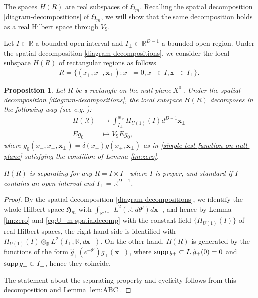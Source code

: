 \documentclass[12pt]{article}
\def\RR{{\mathbb R}}
\def\hm{\mathfrak{H}_m}
\def\supp{{\rm supp\,}}
\newtheorem{proposition}[theorem]{Proposition}
\theoremstyle{remark}
\begin{document}
The spaces $H(R)$ are real subspaces of $\hm$.
Recalling the spatial decomposition \eqref{diagram-decompositions} of $\hm$, we will show that the same decomposition holds as a real Hilbert space through $V_{\mathrm S}$.

Let $I \subset \RR$ a bounded open interval and $I_\perp \subset \RR^{D-1}$ a bounded open region.
Under the spatial decomposition \eqref{diagram-decompositions}, we consider the local subspace $H(R)$ of rectangular regions as follows
\[
 R = \{(x_+,x_-,\pmb{x}_\perp): x_-=0, x_+ \in I, \pmb{x}_\perp \in I_\perp\}. 
\]

  \begin{proposition}\label{decomposition-subspace-null-product}
  Let $R$ be a rectangle on the null plane $X_-^0$.
   Under the spatial decomposition \eqref{diagram-decompositions}, the local subspace $H(R)$
   decomposes in the following way (see e.g.\! \cite[Proposition B.2]{MT18}):
     \begin{align}\label{eq:disrect}
      H(R) &\to \int^{\oplus_\RR}_{I_\perp} H_{U(1)}(I) d^{D-1}\pmb{x}_\perp \\
      Eg_0 &\mapsto  V_{\mathrm S}Eg_0,\nonumber
     \end{align}
 where $g_0(x_-,x_+,\pmb{x}_\perp)= \delta(x_-)g(x_+, \pmb{x}_\perp)$ as in \eqref{simple-test-function-on-null-plane}
 satisfying the condition of Lemma \ref{lm:zero}.

  $H(R)$ is separating for any $R = I\times I_\perp$ where $I$ is proper,
  and standard if $I$ contains an open interval and $I_\perp = \RR^{D-1}$.
  \end{proposition}
  \begin{proof}
    By the spatial decomposition \eqref{diagram-decompositions},
    we identify the whole Hilbert space $\hm$ with $\int_{\RR^{D-1}} L^2(\RR,d\theta')d\pmb{x}_\perp$,
    and hence by Lemma \ref{lm:zero} and \eqref{eq:U_m-spatialdecomp} with the constant field $\{H_{U(1)}(I)\}$ of real Hilbert spaces, the right-hand side
    is identified with $H_{U(1)}(I)\otimes_\RR L^2(I_\perp,\RR, d\pmb{x}_\perp)$.
    On the other hand, $H(R)$ is generated by the functions of the form
    $\hat g_+(e^{-\theta'})g_\perp(\pmb{x}_\perp)$, where $\supp g_+ \subset I, \hat g_+(0) = 0$ and $\supp g_\perp \subset I_\perp$,
    hence they coincide.
    
    The statement about the separating property and cyclicity follows from this decomposition and Lemma \ref{lem:ABC}.
    
\end{proof}
\end{document}
